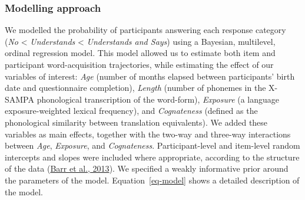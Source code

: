 \documentclass[
]{article}
\begin{document}
\hypertarget{modelling-approach}{%
\subsubsection{Modelling approach}\label{modelling-approach}}

We modelled the probability of participants answering each response
category (\emph{No} \textless{} \emph{Understands} \textless{}
\emph{Understands and Says}) using a Bayesian, multilevel, ordinal
regression model. This model allowed us to estimate both item and
participant word-acquisition trajectories, while estimating the effect
of our variables of interest: \emph{Age} (number of months elapsed
between participants' birth date and questionnaire completion),
\emph{Length} (number of phonemes in the X-SAMPA phonological
transcription of the word-form), \emph{Exposure} (a language
exposure-weighted lexical frequency), and \emph{Cognateness} (defined as
the phonological similarity between translation equivalents). We added
these variables as main effects, together with the two-way and three-way
interactions between \emph{Age}, \emph{Exposure}, and
\emph{Cognateness}. Participant-level and item-level random intercepts
and slopes were included where appropriate, according to the structure
of the data (\protect\hyperlink{ref-barr2013random}{Barr et al., 2013}).
We specified a weakly informative prior around the parameters of the
model. Equation~\ref{eq-model} shows a detailed description of the
model.
\end{document}

